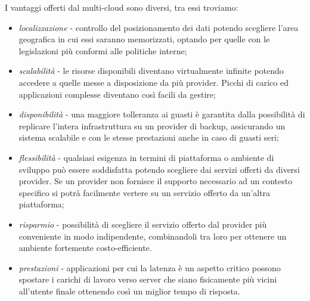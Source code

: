 I vantaggi offerti dal multi-cloud sono diversi, tra essi troviamo:
\begin{itemize}
    \item \textit{localizzazione} - controllo del posizionamento dei dati potendo scegliere l'area geografica in cui essi saranno memorizzati, optando per quelle con le legislazioni più conformi alle politiche interne;

    \item \textit{scalabilità} - le risorse disponibili diventano virtualmente infinite potendo accedere a quelle messe a disposizione da più provider. Picchi di carico ed applicazioni complesse diventano così facili da gestire;
    
    \item \textit{disponibilità} - una maggiore tolleranza ai guasti è garantita dalla possibilità di replicare l’intera infrastruttura su un provider di backup, assicurando un sistema scalabile e con le stesse prestazioni anche in caso di guasti seri;
    
    \item \textit{flessibilità} - qualsiasi esigenza in termini di piattaforma o ambiente di sviluppo può essere soddisfatta potendo scegliere dai servizi offerti da diversi provider. Se un provider non fornisce il supporto necessario ad un contesto specifico si potrà facilmente vertere su un servizio offerto da un’altra piattaforma;
        
    \item \textit{risparmio} - possibilità di scegliere il servizio offerto dal provider più conveniente in modo indipendente, combinandoli tra loro per ottenere un ambiente fortemente costo-efficiente.

    \item \textit{prestazioni} - applicazioni per cui la latenza è un aspetto critico possono spostare i carichi di lavoro verso server che siano fisicamente più vicini all’utente finale ottenendo così un miglior tempo di risposta.

\end{itemize}
